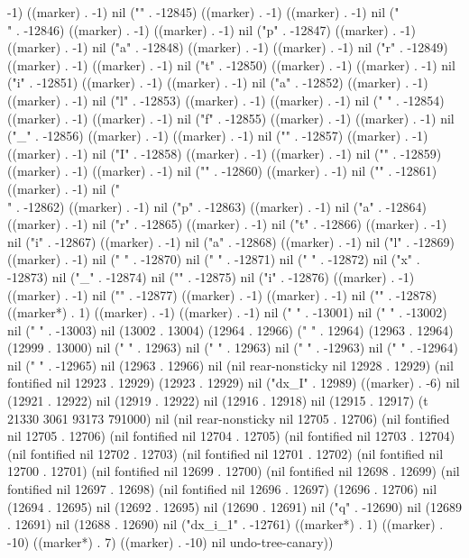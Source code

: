 -1) ((marker) . -1) nil ("{" . -12845) ((marker) . -1) ((marker) . -1) nil ("\\" . -12846) ((marker) . -1) ((marker) . -1) nil ("p" . -12847) ((marker) . -1) ((marker) . -1) nil ("a" . -12848) ((marker) . -1) ((marker) . -1) nil ("r" . -12849) ((marker) . -1) ((marker) . -1) nil ("t" . -12850) ((marker) . -1) ((marker) . -1) nil ("i" . -12851) ((marker) . -1) ((marker) . -1) nil ("a" . -12852) ((marker) . -1) ((marker) . -1) nil ("l" . -12853) ((marker) . -1) ((marker) . -1) nil (" " . -12854) ((marker) . -1) ((marker) . -1) nil ("f" . -12855) ((marker) . -1) ((marker) . -1) nil ("_" . -12856) ((marker) . -1) ((marker) . -1) nil ("{" . -12857) ((marker) . -1) ((marker) . -1) nil ("I" . -12858) ((marker) . -1) ((marker) . -1) nil ("}" . -12859) ((marker) . -1) ((marker) . -1) nil ("}" . -12860) ((marker) . -1) nil ("{" . -12861) ((marker) . -1) nil ("\\" . -12862) ((marker) . -1) nil ("p" . -12863) ((marker) . -1) nil ("a" . -12864) ((marker) . -1) nil ("r" . -12865) ((marker) . -1) nil ("t" . -12866) ((marker) . -1) nil ("i" . -12867) ((marker) . -1) nil ("a" . -12868) ((marker) . -1) nil ("l" . -12869) ((marker) . -1) nil ("
" . -12870) nil (" " . -12871) nil (" " . -12872) nil ("x" . -12873) nil ("_" . -12874) nil ("{" . -12875) nil ("i" . -12876) ((marker) . -1) ((marker) . -1) nil ("}" . -12877) ((marker) . -1) ((marker) . -1) nil ("}" . -12878) ((marker*) . 1) ((marker) . -1) ((marker) . -1) nil ("
" . -13001) nil (" " . -13002) nil (" " . -13003) nil (13002 . 13004) (12964 . 12966) (" " . 12964) (12963 . 12964) (12999 . 13000) nil (" " . 12963) nil ("
" . 12963) nil ("
" . -12963) nil (" " . -12964) nil (" " . -12965) nil (12963 . 12966) nil (nil rear-nonsticky nil 12928 . 12929) (nil fontified nil 12923 . 12929) (12923 . 12929) nil ("dx_{I}" . 12989) ((marker) . -6) nil (12921 . 12922) nil (12919 . 12922) nil (12916 . 12918) nil (12915 . 12917) (t 21330 3061 93173 791000) nil (nil rear-nonsticky nil 12705 . 12706) (nil fontified nil 12705 . 12706) (nil fontified nil 12704 . 12705) (nil fontified nil 12703 . 12704) (nil fontified nil 12702 . 12703) (nil fontified nil 12701 . 12702) (nil fontified nil 12700 . 12701) (nil fontified nil 12699 . 12700) (nil fontified nil 12698 . 12699) (nil fontified nil 12697 . 12698) (nil fontified nil 12696 . 12697) (12696 . 12706) nil (12694 . 12695) nil (12692 . 12695) nil (12690 . 12691) nil ("q" . -12690) nil (12689 . 12691) nil (12688 . 12690) nil ("dx_{i_{1}}" . -12761) ((marker*) . 1) ((marker) . -10) ((marker*) . 7) ((marker) . -10) nil undo-tree-canary))
